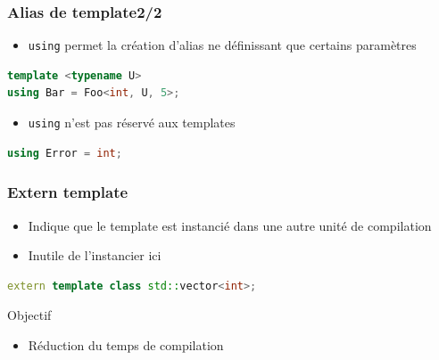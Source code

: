 \documentclass[C++.tex]{subfiles}
\begin{document}
\begin{frame}[fragile]
	\frametitle{Alias de template\titlehfill{}2/2}
	\begin{itemize}
		\item \lstinline|using| permet la création d'alias ne définissant que certains paramètres
	\end{itemize}

	\begin{lstlisting}[language=C++]
template <typename U>
using Bar = Foo<int, U, 5>;\end{lstlisting}

	\pause

	\begin{itemize}
		\item \lstinline|using| n'est pas réservé aux templates
	\end{itemize}


	\begin{lstlisting}[language=C++]
using Error = int;\end{lstlisting}
\end{frame}

\begin{frame}[fragile]
	\frametitle{Extern template}
	\begin{itemize}
		\item Indique que le template est instancié dans une autre unité de compilation
		\item Inutile de l'instancier ici
	\end{itemize}

	\begin{lstlisting}[language=C++]
extern template class std::vector<int>;\end{lstlisting}

	\begin{block}{Objectif}
		\begin{itemize}
			\item Réduction du temps de compilation
		\end{itemize}
	\end{block}
\end{frame}
\end{document}

